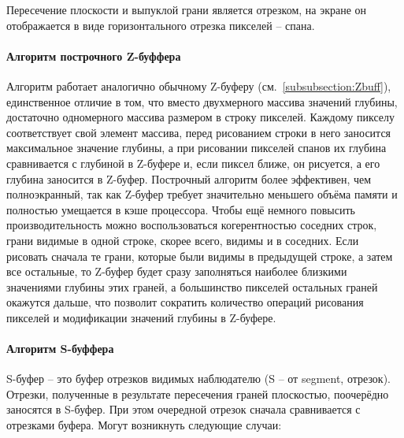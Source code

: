 Пересечение плоскости и выпуклой грани является отрезком, на экране он отображается в виде горизонтального отрезка пикселей -- спана.~\cite{polski}


\paragraph{Алгоритм построчного Z-буффера}

\hspace{1.25cm}
Алгоритм работает аналогично обычному Z-буферу (см.~\autoref{subsubsection:Zbuff}),
единственное отличие в том, что вместо двухмерного массива значений
глубины, достаточно одномерного массива размером в строку пикселей.
Каждому пикселу соответствует свой элемент массива, перед рисованием
строки в него заносится максимальное значение глубины, а при рисовании
пикселей спанов их глубина сравнивается с глубиной в Z-буфере и, если
пиксел ближе, он рисуется, а его глубина заносится в Z-буфер. Построчный алгоритм более эффективен, чем полноэкранный, так как Z-буфер требует значительно меньшего объёма памяти и полностью умещается в кэше процессора. Чтобы ещё немного повысить производительность можно воспользоваться когерентностью соседних строк, грани видимые в одной строке, скорее всего, видимы и в соседних. Если рисовать сначала те
грани, которые были видимы в предыдущей строке, а затем все остальные,
то Z-буфер будет сразу заполняться наиболее близкими значениями глубины этих граней, а большинство пикселей остальных граней окажутся
дальше, что позволит сократить количество операций рисования пикселей
и модификации значений глубины в Z-буфере.~\cite{polski}


\paragraph{Алгоритм S-буффера}

\hspace{1.25cm}
S-буфер -- это буфер отрезков видимых наблюдателю (S -- от segment,
отрезок). Отрезки, полученные в результате пересечения граней плоскостью, поочерёдно заносятся в S-буфер. При этом очередной отрезок сначала сравнивается с отрезками буфера. Могут возникнуть следующие случаи:

